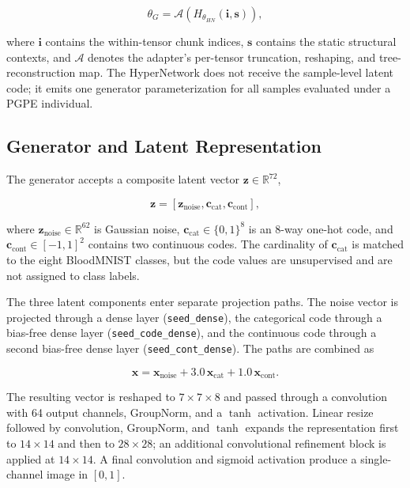 \begin{equation}
\theta_G = \mathcal{A}\!\left(
H_{\theta_{HN}}(\mathbf{i},\mathbf{s})
\right),
\label{eq:hypernet_reconstruction}
\end{equation}

where $\mathbf{i}$ contains the within-tensor chunk indices, $\mathbf{s}$ contains the static structural contexts, and $\mathcal{A}$ denotes the adapter's per-tensor truncation, reshaping, and tree-reconstruction map. The HyperNetwork does not receive the sample-level latent code; it emits one generator parameterization for all samples evaluated under a PGPE individual.

\subsection{Generator and Latent Representation}

The generator accepts a composite latent vector $\mathbf{z} \in \mathbb{R}^{72}$,

\begin{equation}
\mathbf{z} = [\mathbf{z}_{\text{noise}},\mathbf{c}_{\text{cat}},\mathbf{c}_{\text{cont}}],
\end{equation}

where $\mathbf{z}_{\text{noise}} \in \mathbb{R}^{62}$ is Gaussian noise, $\mathbf{c}_{\text{cat}} \in \{0,1\}^{8}$ is an 8-way one-hot code, and $\mathbf{c}_{\text{cont}} \in [-1,1]^2$ contains two continuous codes. The cardinality of $\mathbf{c}_{\text{cat}}$ is matched to the eight BloodMNIST classes, but the code values are unsupervised and are not assigned to class labels.

The three latent components enter separate projection paths. The noise vector is projected through a dense layer (\texttt{seed\_dense}), the categorical code through a bias-free dense layer (\texttt{seed\_code\_dense}), and the continuous code through a second bias-free dense layer (\texttt{seed\_cont\_dense}). The paths are combined as

\begin{equation}
\mathbf{x} = \mathbf{x}_{\text{noise}}
+ 3.0\,\mathbf{x}_{\text{cat}}
+ 1.0\,\mathbf{x}_{\text{cont}}.
\end{equation}

The resulting vector is reshaped to $7 \times 7 \times 8$ and passed through a convolution with 64 output channels, GroupNorm, and a $\tanh$ activation. Linear resize followed by convolution, GroupNorm, and $\tanh$ expands the representation first to $14 \times 14$ and then to $28 \times 28$; an additional convolutional refinement block is applied at $14 \times 14$. A final convolution and sigmoid activation produce a single-channel image in $[0,1]$.

